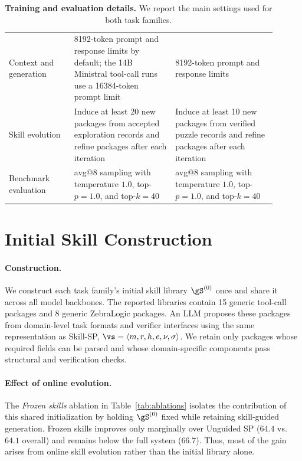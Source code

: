 \begin{table}[htbp]
\begin{tabular}{p{0.22\linewidth} p{0.34\linewidth} p{0.34\linewidth}}
        \addlinespace
        Context and generation & 8192-token prompt and response limits by default; the 14B Ministral tool-call runs use a 16384-token prompt limit & 8192-token prompt and response limits \\
        \addlinespace
        Skill evolution & Induce at least 20 new packages from accepted exploration records and refine packages after each iteration & Induce at least 10 new packages from verified puzzle records and refine packages after each iteration \\
        \addlinespace
        Benchmark evaluation & avg@8 sampling with temperature $1.0$, top-$p=1.0$, and top-$k=40$ & avg@8 sampling with temperature $1.0$, top-$p=1.0$, and top-$k=40$ \\
        \bottomrule
    \end{tabular}
    \caption{\textbf{Training and evaluation details.} We report the main settings used for both task families.}
    \label{tab:training_details}
\end{table}



\section{Initial Skill Construction}
\label{app:initial_skills}

\paragraph{Construction.}
We construct each task family's initial skill library $\gS^{(0)}$ once and share it across all model backbones. The reported libraries contain 15 generic tool-call packages and 8 generic ZebraLogic packages. An LLM proposes these packages from domain-level task formats and verifier interfaces using the same representation as Skill-SP, $\vs=\langle m,r,h,e,\nu,\sigma\rangle$. We retain only packages whose required fields can be parsed and whose domain-specific components pass structural and verification checks.

\paragraph{Effect of online evolution.}
The \emph{Frozen skills} ablation in Table~\ref{tab:ablations} isolates the contribution of this shared initialization by holding $\gS^{(0)}$ fixed while retaining skill-guided generation. Frozen skills improves only marginally over Unguided SP ($64.4$ vs. $64.1$ overall) and remains below the full system ($66.7$). Thus, most of the gain arises from online skill evolution rather than the initial library alone.



